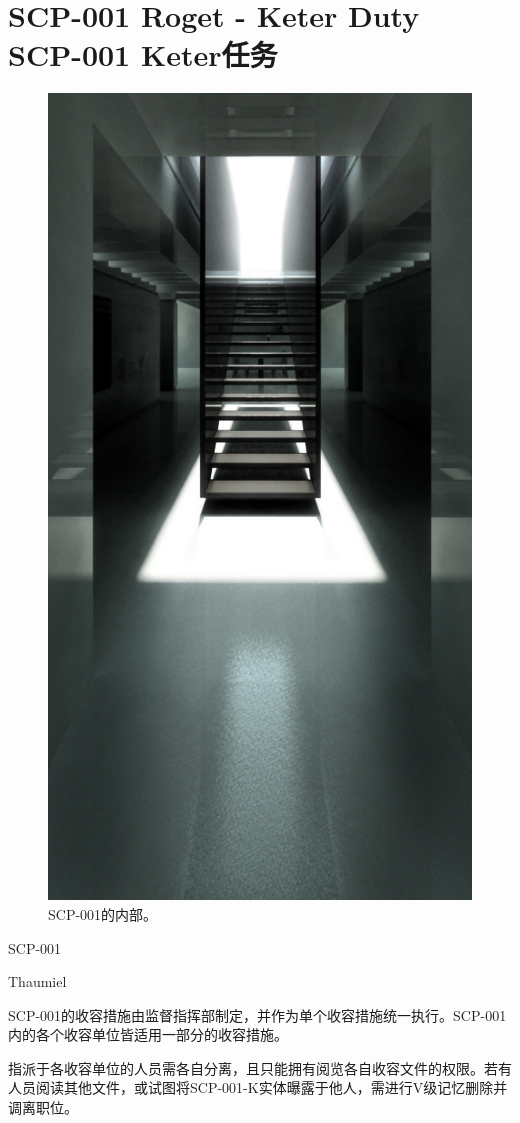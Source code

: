 \chapter[SCP-001 Keter任务]{
	SCP-001 Roget - Keter Duty \\
	SCP-001 Keter任务
}

\label{chap:SCP-001.keter.duty}

\begin{figure}[H]
    \centering
    \includegraphics[width=0.4\linewidth]{images/SCP-001-keter-duty.jpg}
    \caption*{SCP-001的内部。}
\end{figure}

SCP-001

Thaumiel

SCP-001的收容措施由监督指挥部制定，并作为单个收容措施统一执行。SCP-001内的各个收容单位皆适用一部分的收容措施。

指派于各收容单位的人员需各自分离，且只能拥有阅览各自收容文件的权限。若有人员阅读其他文件，或试图将SCP-001-K实体曝露于他人，需进行V级记忆删除并调离职位。

